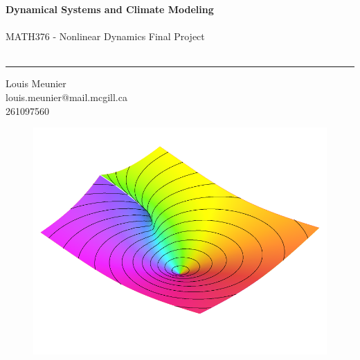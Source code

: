 \documentclass[12pt]{article}
\newcommand{\titlename}{Dynamical Systems and Climate Modeling}
\newcommand{\subtitlename}{MATH376 - Nonlinear Dynamics Final Project}
\begin{document}
\pagestyle{plain}
\thispagestyle{empty}

\noindent
{\huge\textbf{\titlename}}\\\\
{\large \subtitlename}\\\\
\rule[2ex]{\textwidth}{2.5pt}
\begin{center}
{\small Louis Meunier}\\
{\small louis.meunier@mail.mcgill.ca}\\
{\small 261097560}
\end{center}
\begin{figure}[!ht]
    \centering
    \includegraphics*{figures/temp.png}
\end{figure}
\begin{abstract}
    The atmosphere is a notoriously complicated system to effectively model. From a mathematical standpoint, there is a necessity for a particular amount of simplicity and physical assumptions in order for models to be reasonable to analyze. On the other hand, excessive simplifications lead to misrepresentative results which, while mathematically convenient, are, from an application standpoint, functionally useless.

    In this article, we will give an overview of approaches that attempt to thread the line of these differing necessities, with a focus on Delay Differential Equations (DDEs), their effectiveness in modeling natural phenomena, and some methods used to analyze them.
\end{abstract}
\end{document}
